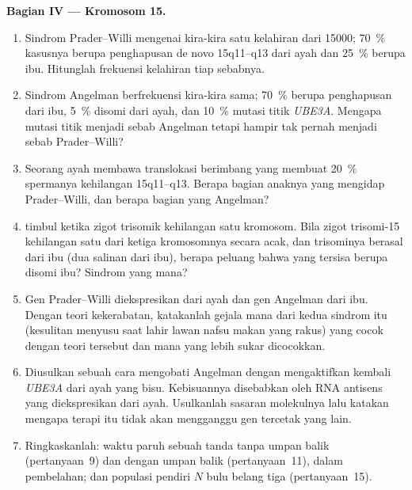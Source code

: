 \begin{problem}
\medskip
\noindent\textbf{Bagian IV --- Kromosom 15.}
\begin{enumerate}[resume]
  \item Sindrom Prader--Willi mengenai kira-kira satu kelahiran dari
        \num{15000}; \qty{70}{\%} kasusnya berupa penghapusan de novo
        15q11--q13 dari ayah dan \qty{25}{\%} berupa 
        ibu. Hitunglah frekuensi kelahiran tiap sebabnya.
  \item Sindrom Angelman berfrekuensi kira-kira sama; \qty{70}{\%} berupa
        penghapusan dari ibu, \qty{5}{\%} disomi dari ayah, dan
        \qty{10}{\%} mutasi titik \emph{UBE3A}. Mengapa mutasi titik
        menjadi sebab Angelman tetapi hampir tak pernah menjadi sebab
        Prader--Willi?
  \item Seorang ayah membawa translokasi berimbang yang membuat
        \qty{20}{\%} spermanya kehilangan 15q11--q13. Berapa bagian anaknya
        yang mengidap Prader--Willi, dan berapa bagian yang Angelman?
  \item {} timbul ketika zigot trisomik kehilangan satu
        kromosom. Bila zigot trisomi-15 kehilangan satu dari ketiga
        kromosomnya secara acak, dan trisominya berasal dari ibu (dua
        salinan dari ibu), berapa peluang bahwa yang tersisa berupa disomi
        ibu? Sindrom yang mana?
  \item Gen Prader--Willi diekspresikan dari ayah dan gen Angelman dari
        ibu. Dengan teori kekerabatan, katakanlah gejala mana dari kedua
        sindrom itu (kesulitan menyusu saat lahir lawan nafsu makan yang
        rakus) yang cocok dengan teori tersebut dan mana yang lebih sukar
        dicocokkan.
  \item Diusulkan sebuah cara mengobati Angelman dengan mengaktifkan
        kembali \emph{UBE3A} dari ayah yang bisu. Kebisuannya disebabkan
        oleh RNA antisens yang diekspresikan dari ayah. Usulkanlah sasaran
        molekulnya lalu katakan mengapa terapi itu tidak akan mengganggu
        gen tercetak yang lain.
  \item Ringkaskanlah: waktu paruh sebuah tanda tanpa umpan balik
        (pertanyaan~9) dan dengan umpan balik (pertanyaan~11), dalam
        pembelahan; dan populasi pendiri $N$ bulu belang tiga
        (pertanyaan~15).
\end{enumerate}
\end{problem}
